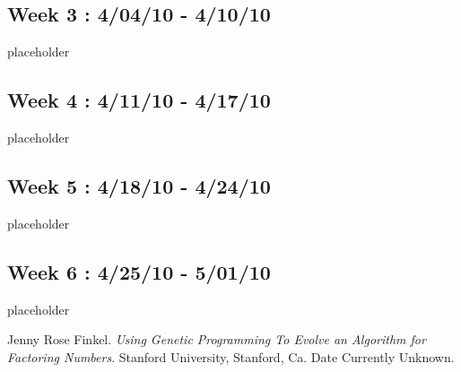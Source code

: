 \documentclass{article}
\begin{document}
\subsection{Week 3 : 4/04/10 - 4/10/10}

placeholder 

\subsection{Week 4 : 4/11/10 - 4/17/10}

placeholder

\subsection{Week 5 : 4/18/10 - 4/24/10}

placeholder

\subsection{Week 6 : 4/25/10 - 5/01/10}

placeholder



\pagebreak


\clearpage
{}
{}


\begin{thebibliography}{9}

    Jenny Rose Finkel.
    \emph{Using Genetic Programming To Evolve an Algorithm for Factoring Numbers}.
    Stanford University, Stanford, Ca. 
    Date Currently Unknown.

\end{thebibliography}
\end{document}
